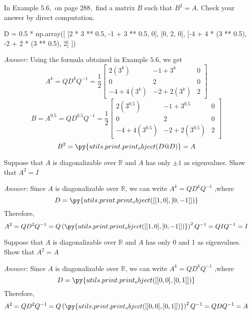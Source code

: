 \documentclass[letterpaper]{article}
\newcommand{\ans}{\textit{Answer: }}
\newenvironment{question}[2][Question]{\begin{trivlist}
\item[\hskip \labelsep {\bfseries #1}\hskip \labelsep {\bfseries #2.}]}{\end{trivlist}}
\newcommand{\printobj}[1]{\py{utils.print.print_object(#1)}}
\begin{document}
\begin{question}{5.32}
  In Example $5.6,$ on page $288,$ find a matrix $B$ such that $B^{2}=A .$ Check your
  answer by direct computation.

  \begin{pycode}
D = 0.5 * np.array([
  [2 * 3 ** 0.5, -1 + 3 ** 0.5, 0],
  [0, 2, 0],
  [-4 + 4 * (3 ** 0.5), -2 + 2 * (3 ** 0.5), 2]
])
  \end{pycode}
  
  \ans Using the formula obtained in Example $5.6$, we get 
  $$
  A^{k}=Q D^{k} Q^{-1}=\frac{1}{2} \left[ \begin{array}{ccc}{2\left(3^{k}\right)} & {-1+3^{k}} & {0} \\ {0} & {2} & {0} \\ {-4+4\left(3^{k}\right)} & {-2+2\left(3^{k}\right)} & {2}\end{array}\right]
  $$
  $$
  B = A^{0.5} = Q D^{0.5} Q^{-1}=\frac{1}{2} \left[ \begin{array}{ccc}{2\left(3^{0.5}\right)} & {-1+3^{0.5}} & {0} \\ {0} & {2} & {0} \\ {-4+4\left(3^{0.5}\right)} & {-2+2\left(3^{0.5}\right)} & {2}\end{array}\right]
  $$
  $$B^2 = \printobj{D @ D} = A$$
\end{question}

\begin{question}{5.33}
  Suppose that $A$ is diagonalizable over $\mathbb{R}$ and $A$ has only $\pm 1$ as eigenvalues.
  Show that $A^{2}=I$

  \ans Since $A$ is diagonalizable over $\mathbb{R}$, we can write
  $A^k = QD^kQ^{-1}$
  ,where 
  $$D = \printobj{[[1, 0], [0, -1]]}$$
  Therefore, 
  $$A^2 = QD^2Q^{-1} = Q\left(\printobj{[[1, 0], [0, -1]]}\right)^2Q^{-1} =  QIQ^{-1} = I$$
\end{question}

\begin{question}{5.34}
  Suppose that $A$ is diagonalizable over $\mathbb{R}$ and $A$ has only 0 and 1 as eigenvalues.
  Show that $A^{2}=A$

  \ans Since $A$ is diagonalizable over $\mathbb{R}$, we can write
  $A^k = QD^kQ^{-1}$
  ,where 
  $$D = \printobj{[[0, 0], [0, 1]]}$$
  Therefore, 
  $$A^2 = QD^2Q^{-1} = Q\left(\printobj{[[0, 0], [0, 1]]}\right)^2Q^{-1} =  QDQ^{-1} = A$$
  
\end{question}
\end{document}

